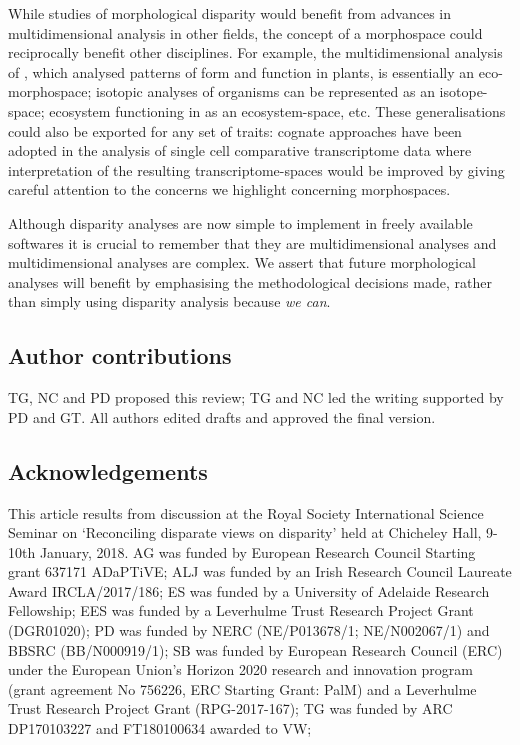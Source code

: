 \documentclass[12pt,letterpaper]{article}
\begin{document}
While studies of morphological disparity would benefit from advances in multidimensional analysis in other fields, the concept of a morphospace could reciprocally benefit other disciplines.
For example, the multidimensional analysis of \citep{Diaz2016-mr}, which analysed patterns of form and function in plants, is essentially an eco-morphospace; isotopic analyses of organisms \citep{Jackson2011-kq,Swanson2015} can be represented as an isotope-space; ecosystem functioning in \citealt{Donohue2013-bg} as an ecosystem-space, etc.
These generalisations could also be exported for any set of traits: cognate approaches have been adopted in the analysis of single cell comparative transcriptome data \citep{Sebe-Pedros2018-sw} where interpretation of the resulting transcriptome-spaces would be improved by giving careful attention to the concerns we highlight concerning morphospaces.

Although disparity analyses are now simple to implement in freely available softwares \citep{Navarro2003-vz, Bouxin2005-wk, oksanen2007vegan, Harmon2008-gq, lloyd2016, Guillerme2018-uc} it is crucial to remember that they are multidimensional analyses and multidimensional analyses are complex.
We assert that future morphological analyses will benefit by emphasising the methodological decisions made, rather than simply using disparity analysis because \textit{we can}.

\subsection{Author contributions}

TG, NC and PD proposed this review; TG and NC led the writing supported by PD and GT. All authors edited drafts and approved the final version.

\subsection{Acknowledgements}

This article results from discussion at the Royal Society International Science Seminar on `Reconciling disparate views on disparity' held at Chicheley Hall, 9-10th January, 2018.
AG was funded by European Research Council Starting grant 637171 ADaPTiVE;
ALJ was funded by an Irish Research Council Laureate Award IRCLA/2017/186;
ES was funded by a University of Adelaide Research Fellowship;
EES was funded by a Leverhulme Trust Research Project Grant (DGR01020);
PD was funded by NERC (NE/P013678/1; NE/N002067/1) and BBSRC (BB/N000919/1);
SB was funded by European Research Council (ERC) under the European Union's Horizon 2020 research and innovation program (grant agreement No 756226, ERC Starting Grant: PalM) and a Leverhulme Trust Research Project Grant (RPG-2017-167);
TG was funded by ARC DP170103227 and FT180100634 awarded to VW;
\end{document}

